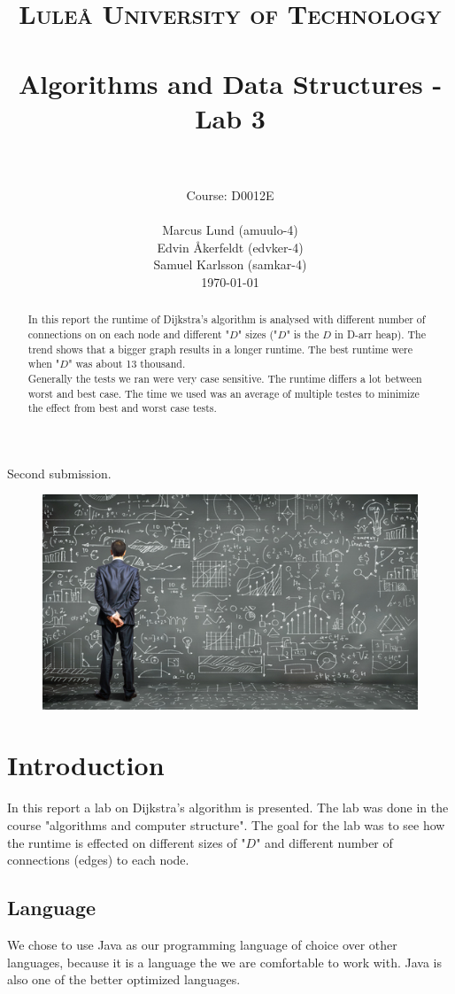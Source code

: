 \documentclass[paper=a4, fontsize=11pt]{scrartcl}
\title{
		\usefont{OT1}{bch}{b}{n}
		\normalfont \normalsize \textsc{Luleå University of Technology} \\ [25pt]
		\horrule{0.5pt} \\[0.4cm]
		\huge Algorithms and Data Structures - Lab 3 \\
		\horrule{2pt} \\[0.5cm]
}
\author{Course: D0012E \\ \\ 
		\normalfont 								\normalsize
        Marcus Lund (amuulo-4) \\\normalfont\normalsize Edvin Åkerfeldt (edvker-4)\\\normalfont\normalsize Samuel Karlsson (samkar-4)\\[-3pt]		\normalsize
        \today
}
\date{}
\numberwithin{equation}{section}		%
\numberwithin{figure}{section}			%
\numberwithin{table}{section}				%
\begin{document}
\maketitle
\centerline{Second submission.}
\begin{figure}[h!]
  \centering
    \includegraphics[width=1\textwidth]{algorithm}
\end{figure}
\newpage

\begin{abstract}
In this report the runtime of Dijkstra’s algorithm is analysed with different number of connections on on each node and different "$D$" sizes ("$D$" is the $D$ in D-arr heap). The trend shows that a bigger graph results in a longer runtime. The best runtime were when "$D$" was about 13 thousand.
\\

Generally the tests we ran were very case sensitive. The runtime differs a lot between worst and best case. The time we used was an average of multiple testes to minimize the effect from best and worst case tests.  
\end{abstract}

\tableofcontents
\newpage

\section{Introduction}
In this report a lab on Dijkstra’s algorithm is presented. The lab was done in the course "algorithms and computer structure". The goal for the lab was to see how the runtime is effected on different sizes of "$D$" and different number of connections (edges) to each node.

\subsection{Language}
We chose to use Java as our programming language of choice over other languages, because it is a language the we are comfortable to work with. Java is also one of the better optimized languages.
\end{document}
